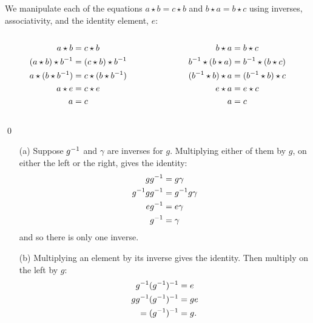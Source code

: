 \documentclass[../algebraNotesMSRI-UP2016.tex]{subfiles}
\begin{document}
\answerKey
\begin{frame}{\subsecname}
We manipulate each of the equations $a\star b=c\star b$ and $b\star a=b\star c$ using inverses, associativity, and the identity element, $e$:
\begin{columns}
\begin{column}{0.2\textwidth}
	\begin{align*}
	a\star b &= c\star b \\
	(a\star b)\star b^{-1} &= (c\star b)\star b^{-1} \\
	a\star (b\star b^{-1}) &= c\star(b\star b^{-1}) \\
	a\star e &= c\star e \\
	a &= c
	\end{align*}
\end{column}
\begin{column}{0.2\textwidth}
	\begin{align*}
	b\star a &= b\star c \\
	b^{-1}\star(b\star a) &= b^{-1}\star(b\star c) \\
	(b^{-1}\star b)\star a &= (b^{-1}\star b)\star c \\
	e\star a &= e\star c \\
	a &= c
	\end{align*}
\end{column}
\end{columns}	
\qed
\end{frame}

\begin{frame}
\begin{itemize}
\item[(a)]\label{exeSol:inverses-a} Suppose $g^{-1}$ and $\gamma$ are inverses for $g$.  Multiplying either of them by $g$, on either the left or the right, gives the identity:
\begin{align*}
gg^{-1} &= g\gamma \\
g^{-1}gg^{-1} &= g^{-1} g\gamma \\
eg^{-1} &= e\gamma \\
g^{-1} &= \gamma 
\end{align*}
and so there is only one inverse.
\item[(b)] Multiplying an element by its inverse gives the identity.  Then multiply on the left by $g$:
\begin{align*}
g^{-1}(g^{-1})^{-1} &= e \\
gg^{-1}(g^{-1})^{-1} &= ge \\
= (g^{-1})^{-1} &= g. 
\end{align*}
\end{itemize}
\end{frame}
\end{document}
